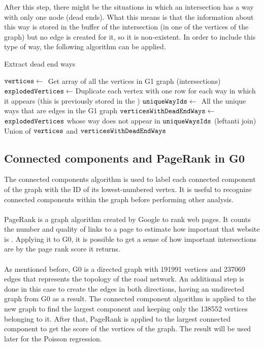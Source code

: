 After this step, there might be the situations in which an intersection has a way with only one node (dead ends). What this means is that the information about this way is stored in the buffer of the intersection (in one of the vertices of the graph) but no edge is created for it, so it is non-existent. In order to include this type of way, the following algorithm can be applied.


\begin{algorithm}[H]
\caption{Extract dead end ways}\label{alg:dead_end}
\begin{algorithmic}[1]
\State $\texttt{vertices} \leftarrow{}$ Get array of all the vertices in G1 graph (intersections)
\State $\texttt{explodedVertices} \leftarrow{}$Duplicate each vertex with one row for each way in which it appears (this is previously stored in the )
\State $\texttt{uniqueWayIds} \leftarrow{}$ All the unique ways that are edges in the G1 graph
\State $\texttt{verticesWithDeadEndWays} \leftarrow{}$ $\texttt{explodedVertices}$ whose way does not appear in $\texttt{uniqueWaysIds}$ (leftanti join)
\State Union of $\texttt{vertices}$ and $\texttt{verticesWithDeadEndWays}$
\end{algorithmic} 
\end{algorithm}

\subsection{Connected components and PageRank in G0}
The connected components algorithm is used to label each connected component of the graph with the ID of its lowest-numbered vertex. It is useful to recognize connected components within the graph before performing other analysis.
\\
\\
PageRank is a graph algorithm created by Google to rank web pages. It counts the number and quality of links to a page to estimate how important that website is \cite{spark-guide}. Applying it to G0, it is possible to get a sense of how important intersections are by the page rank score it returns. 
\\
\\
As mentioned before, G0 is a directed graph with 191991 vertices and  237069 edges that represents the topology of the road network. An additional step is done in this case to create the edges in both directions, having an undirected graph from G0 as a result. The connected component algorithm is applied to the new graph to find the largest component and keeping only the 138552 vertices belonging to it. After that, PageRank is applied to the largest connected component to get the score of the vertices of the graph. The result will be used later for the Poisson regression.

